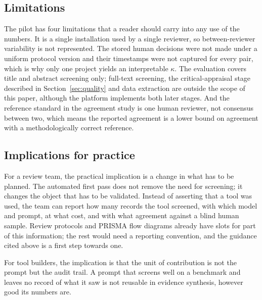 \subsection{Limitations}

The pilot has four limitations that a reader should carry into any use of the
numbers. It is a single installation used by a single reviewer, so
between-reviewer variability is not represented. The stored human decisions
were not made under a uniform protocol version and their timestamps were not
captured for every pair, which is why only one project yields an interpretable
$\kappa$. The evaluation covers title and abstract screening only; full-text
screening, the critical-appraisal stage described in
Section~\ref{sec:quality} and data extraction are outside the scope of this
paper, although the platform implements both later stages. And the reference
standard in the agreement study is one human reviewer, not consensus between
two, which means the reported agreement is a lower bound on agreement with a
methodologically correct reference.

\subsection{Implications for practice}

For a review team, the practical implication is a change in what has to be
planned. The automated first pass does not remove the need for screening; it
changes the object that has to be validated. Instead of asserting that a tool
was used, the team can report how many records the tool screened, with which
model and prompt, at what cost, and with what agreement against a blind human
sample. Review protocols and PRISMA flow diagrams already have slots for part
of this information; the rest would need a reporting convention, and the
guidance cited above is a first step towards one.

For tool builders, the implication is that the unit of contribution is not the
prompt but the audit trail. A prompt that screens well on a benchmark and
leaves no record of what it saw is not reusable in evidence synthesis, however
good its numbers are.
